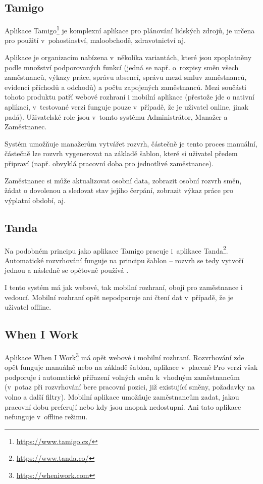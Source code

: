 \documentclass[twoside]{ctuthesis}
\begin{document}
\subsection{Tamigo}
Aplikace Tamigo\footnote{\url{https://www.tamigo.cz/}} je komplexní aplikace pro plánování lidských zdrojů, je určena pro použití v~pohostinství, maloobchodě, zdravotnictví aj. \cite{tamigo2020reseni}

Aplikace je organizacím nabízena v~několika variantách, které jsou zpop\-lat\-ně\-ny podle množství podporovaných funkcí (jedná se např. o~rozpisy směn všech zaměstnanců, výkazy práce, správu absencí, správu mezd smluv zaměstnanců, evidenci příchodů a odchodů) a počtu zapojených zaměstnanců. Mezi součásti tohoto produktu patří webové rozhraní i mobilní aplikace (přestože jde o nativní aplikaci, v~testované verzi funguje pouze v~případě, že je uživatel online, jinak padá). Uživatelské role jsou v~tomto systému Administrátor, Manažer a Zaměstnanec.

Systém umožňuje manažerům vytvářet rozvrh, částečně je tento proces manuální, částečně lze rozvrh vygenerovat na základě šablon, které si uživatel předem připraví (např. obvyklá pracovní doba pro jednotlivé zaměstnance).

Za\-měst\-na\-nec si může aktualizovat osobní data, zobrazit osobní rozvrh směn, žádat o dovolenou a sledovat stav jejího čerpání, zobrazit výkaz práce pro výplatní období, aj.

\subsection{Tanda}
Na podobném principu jako aplikace Tamigo pracuje i~aplikace Tanda\footnote{\url{https://www.tanda.co/}}. Automatické rozvrhování funguje na principu šablon -- rozvrh se tedy vytvoří jednou a následně se opětovně používá \cite{tanda2020rosters}.

I tento systém má jak webové, tak mobilní rozhraní, obojí pro zaměstnance i vedoucí. Mobilní rozhraní opět nepodporuje ani čtení dat v~případě, že je uživatel offline.

\subsection{When I Work}
Aplikace When I Work\footnote{\url{https://wheniwork.com}} má opět webové i mobilní rozhraní. Rozvrhování zde opět funguje manuálně nebo na základě šablon, aplikace v~placené Pro verzi \cite{wheinwork2020pricing} však podporuje i automatické přiřazení volných směn k~vhodným zaměstnancům (v~potaz při rozvrhování bere pracovní pozici, již existující směny, požadavky na volno a další filtry). \cite{wheinwork2020employee} Mobilní aplikace umožňuje zaměstnancům zadat, jakou pracovní dobu preferují nebo kdy jsou naopak nedostupní. Ani tato aplikace nefunguje v~offline režimu.
\end{document}
